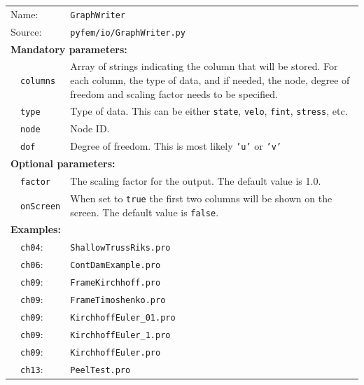 \documentclass{article}
\begin{document}
\vspace{2mm}
\begin{tabular}{p{22mm}p{74mm}}
Name:         & \texttt{GraphWriter} \\
Source:  & \texttt{pyfem/io/GraphWriter.py} \\
\multicolumn{2}{l}{\textbf{Mandatory parameters:}} \\
~~\texttt{columns} & Array of strings indicating the column that will be stored. For each column,
                   the type of data, and if needed, the node, degree of freedom and scaling factor needs to be specified.\\
~~\texttt{type}    & Type of data. This can be either \texttt{state}, \texttt{velo}, \texttt{fint}, \texttt{stress}, etc.\\
~~\texttt{node}    & Node ID.\\
~~\texttt{dof}     & Degree of freedom. This is most likely \texttt{'u'} or \texttt{'v'}\\
\multicolumn{2}{l}{\textbf{Optional parameters:}} \\ 
~~\texttt{factor} & The scaling factor for the output. The default value is 1.0.\\
~~\texttt{onScreen} & When set to \texttt{true} the first two columns will be shown on the screen. The default value is \texttt{false}.\\
\multicolumn{2}{l}{\textbf{Examples:}}\\
~~\texttt{ch04}: & \texttt{ShallowTrussRiks.pro}\\
~~\texttt{ch06}: & \texttt{ContDamExample.pro}\\
~~\texttt{ch09}: & \texttt{FrameKirchhoff.pro}\\
~~\texttt{ch09}: & \texttt{FrameTimoshenko.pro}\\
~~\texttt{ch09}: & \texttt{KirchhoffEuler\_01.pro}\\
~~\texttt{ch09}: & \texttt{KirchhoffEuler\_1.pro}\\
~~\texttt{ch09}: & \texttt{KirchhoffEuler.pro}\\
~~\texttt{ch13}: & \texttt{PeelTest.pro}
\end{tabular}

\end{document}

